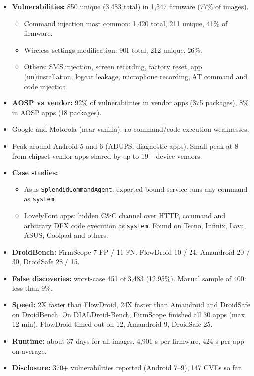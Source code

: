 \documentclass[11pt,a4paper]{article}
\begin{document}
\begin{enumerate}
    \begin{itemize}
        \item \textbf{Vulnerabilities:} 850 unique (3,483 total) in 1,547 firmware (77\% of images).
        \begin{itemize}
            \item Command injection most common: 1,420 total, 211 unique, 41\% of firmware.
            \item Wireless settings modification: 901 total, 212 unique, 26\%.
            \item Others: SMS injection, screen recording, factory reset, app (un)installation, logcat leakage, microphone recording, AT command and code injection.
        \end{itemize}
        \item \textbf{AOSP vs vendor:} 92\% of vulnerabilities in vendor apps (375 packages), 8\% in AOSP apps (18 packages).
        \item Google and Motorola (near-vanilla): no command/code execution weaknesses.
        \item Peak around Android 5 and 6 (ADUPS, diagnostic apps). Small peak at 8 from chipset vendor apps shared by up to 19+ device vendors.
        \item \textbf{Case studies:}
        \begin{itemize}
            \item Asus \texttt{SplendidCommandAgent}: exported bound service runs any command as \texttt{system}.
            \item LovelyFont apps: hidden C\&C channel over HTTP, command and arbitrary DEX code execution as \texttt{system}. Found on Tecno, Infinix, Lava, ASUS, Coolpad and others.
        \end{itemize}
        \item \textbf{DroidBench:} FirmScope 7 FP / 11 FN. FlowDroid 10 / 24, Amandroid 20 / 30, DroidSafe 28 / 15.
        \item \textbf{False discoveries:} worst-case 451 of 3,483 (12.95\%). Manual sample of 400: less than 9\%.
        \item \textbf{Speed:} 2X faster than FlowDroid, 24X faster than Amandroid and DroidSafe on DroidBench. On DIALDroid-Bench, FirmScope finished all 30 apps (max 12 min). FlowDroid timed out on 12, Amandroid 9, DroidSafe 25.
        \item \textbf{Runtime:} about 37 days for all images. 4,901 s per firmware, 424 s per app on average.
        \item \textbf{Disclosure:} 370+ vulnerabilities reported (Android 7--9), 147 CVEs so far.
    \end{itemize}


\end{enumerate}
\end{document}
